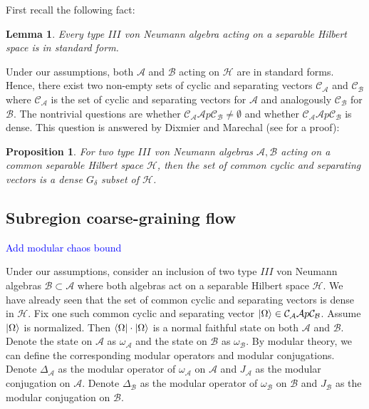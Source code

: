 \documentclass[a4paper,11pt]{article}
\newtheorem{lemma}[theorem]{Lemma}
\newtheorem{proposition}[theorem]{Proposition}
\theoremstyle{definition}
\newcommand{\NL}[1]{\textcolor{blue}{#1}}
\begin{document}
First recall the following fact\cite{blackadar}:
\begin{lemma}\label{lemma:blackadar}
    Every type $III$ von Neumann algebra acting on a separable Hilbert space is in standard form.
\end{lemma}
Under our assumptions, both $\mathcal{A}$ and $\mathcal{B}$ acting on $\mathcal{H}$ are in standard forms. Hence, there exist two non-empty sets of cyclic and separating vectors $\mathcal{C}_\mathcal{A}$ and $\mathcal{C}_\mathcal{B}$ where $\mathcal{C}_\mathcal{A}$ is the set of cyclic and separating vectors for $\mathcal{A}$ and analogously $\mathcal{C}_\mathcal{B}$ for $\mathcal{B}$. The nontrivial questions are whether $\mathcal{C}_\mathcal{A}\mathcal{A}p\mathcal{C}_\mathcal{B} \neq\emptyset$ and whether $\mathcal{C}_\mathcal{A}\mathcal{A}p\mathcal{C}_\mathcal{B}$ is dense. This question is answered by Dixmier and Marechal (see \cite{dixmiermarechal} for a proof):
\begin{proposition}\label{prop:density}
    For two type $III$ von Neumann algebras $\mathcal{A}, \mathcal{B}$ acting on a common separable Hilbert space $\mathcal{H}$, then the set of common cyclic and separating vectors is a dense $G_\delta$ subset of $\mathcal{H}$.
\end{proposition}



\subsection*{Subregion coarse-graining flow}

\NL{Add modular chaos bound}

Under our assumptions, consider an inclusion of two type $III$ von Neumann algebras $\mathcal{B}\subset \mathcal{A}$ where both algebras act on a separable Hilbert space $\mathcal{H}$. We have already seen that the set of common cyclic and separating vectors is dense in $\mathcal{H}$. Fix one such common cyclic and separating vector $\ket{\Omega}\in\mathcal{C}_\mathcal{A}\mathcal{A}p\mathcal{C}_\mathcal{B}$. Assume $\ket{\Omega}$ is normalized. Then $\bra{\Omega}\cdot\ket{\Omega}$ is a normal faithful state on both $\mathcal{A}$ and $\mathcal{B}$. Denote the state on $\mathcal{A}$ as $\omega_\mathcal{A}$ and the state on $\mathcal{B}$ as $\omega_\mathcal{B}$. By modular theory, we can define the corresponding modular operators and modular conjugations. Denote $\Delta_\mathcal{A}$ as the modular operator of $\omega_\mathcal{A}$ on $\mathcal{A}$ and $J_\mathcal{A}$ as the modular conjugation on $\mathcal{A}$. Denote $\Delta_\mathcal{B}$ as the modular operator of $\omega_\mathcal{B}$ on $\mathcal{B}$ and $J_\mathcal{B}$ as the modular conjugation on $\mathcal{B}$.
\end{document}
